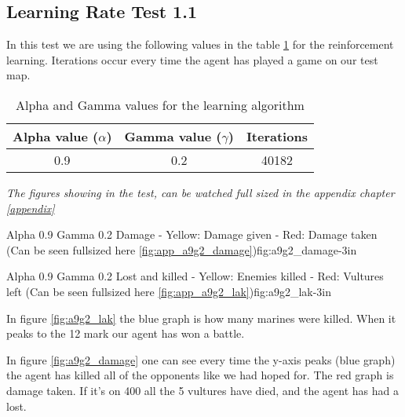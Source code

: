 \subsection*{Learning Rate Test 1.1}
In this test we are using the following values in the table \ref{a9g2_table} for the reinforcement learning. Iterations occur every time the agent has played a game on our test map.

\begin{centering}
\begin{table}[H]
 \begin{tabular}{|c|c|c|}
	\hline
		Alpha value ($\alpha$) & Gamma value ($\gamma$) & Iterations\\
	\hline
		0.9 & 0.2 & 40182 \\
	\hline
\end{tabular}
\label{a9g2_table}
\caption{Alpha and Gamma values for the learning algorithm}
\end{table}
\end{centering}


\textit{The figures showing in the test, can be watched full sized in the appendix chapter \ref{appendix}} 

			{Alpha 0.9 Gamma 0.2 Damage - Yellow: Damage given - Red: Damage taken (Can be seen fullsized here \ref{fig:app_a9g2_damage})}{fig:a9g2_damage}{-3in}

			{Alpha 0.9 Gamma 0.2 Lost and killed - Yellow: Enemies killed - Red: Vultures left (Can be seen fullsized here \ref{fig:app_a9g2_lak})}{fig:a9g2_lak}{-3in}
			
			
In figure \ref{fig:a9g2_lak} the blue graph is how many marines were killed. When it peaks to the 12 mark our agent has won a battle.




In figure \ref{fig:a9g2_damage} one can see every time the y-axis peaks (blue graph) the agent has killed all of the opponents like we had hoped for. The red graph is damage taken. If it's on 400 all the 5 vultures have died, and the agent has had a lost.

